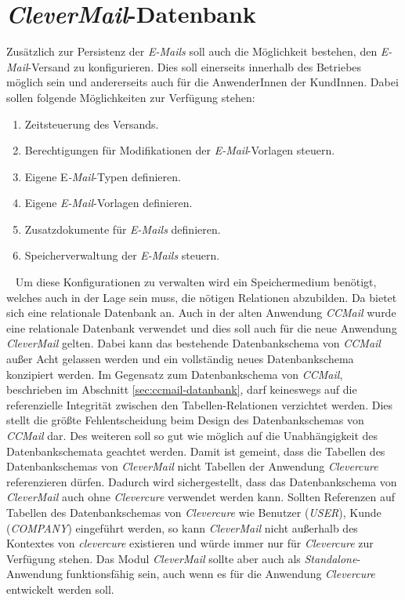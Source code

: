 \section{\emph{CleverMail}-Datenbank}
Zusätzlich zur Persistenz der \emph{E-Mails} soll auch die Möglichkeit bestehen, den \emph{E-Mail}-Versand zu konfigurieren. Dies soll einerseits innerhalb des Betriebes möglich sein und andererseits auch für die AnwenderInnen der KundInnen. Dabei sollen folgende Möglichkeiten zur Verfügung stehen:
\begin{enumerate}
	\item Zeitsteuerung des Versands.
	\item Berechtigungen für Modifikationen der \emph{E-Mail}-Vorlagen steuern.
	\item Eigene E\emph{-Mail}-Typen definieren.
	\item Eigene \emph{E-Mail}-Vorlagen definieren.
	\item Zusatzdokumente für \emph{E-Mails} definieren. 
	\item Speicherverwaltung der \emph{E-Mails} steuern.
\end{enumerate}
\ \newline
Um diese Konfigurationen zu verwalten wird ein Speichermedium benötigt, welches auch in der Lage sein muss, die nötigen Relationen abzubilden. Da bietet sich eine relationale Datenbank an. Auch in der alten Anwendung \emph{CCMail} wurde eine relationale Datenbank verwendet und dies soll auch für die neue Anwendung \emph{CleverMail} gelten. Dabei kann das bestehende Datenbankschema von \emph{CCMail} außer Acht gelassen werden und ein vollständig neues Datenbankschema konzipiert werden. 
\newline
\newline
Im Gegensatz zum Datenbankschema von \emph{CCMail}, beschrieben im Abschnitt \ref{sec:ccmail-datanbank}, darf keineswegs auf die referenzielle Integrität zwischen den Tabellen-Relationen verzichtet werden. Dies stellt die größte Fehlentscheidung beim Design des Datenbankschemas von \emph{CCMail} dar. Des weiteren soll so gut wie möglich auf die Unabhängigkeit des Datenbankschemata geachtet werden. Damit ist gemeint, dass die Tabellen des Datenbankschemas von \emph{CleverMail} nicht Tabellen der Anwendung \emph{Clevercure} referenzieren dürfen. Dadurch wird sichergestellt, dass das Datenbankschema von \emph{CleverMail} auch ohne \emph{Clevercure} verwendet werden kann. Sollten Referenzen auf Tabellen des Datenbankschemas von \emph{Clevercure} wie Benutzer (\emph{USER}), Kunde (\emph{COMPANY}) eingeführt werden, so kann \emph{CleverMail} nicht außerhalb des Kontextes von \emph{clevercure} existieren und würde immer nur für \emph{Clevercure} zur Verfügung stehen. Das Modul \emph{CleverMail} sollte aber auch als \emph{Standalone}-Anwendung funktionsfähig sein, auch wenn es für die Anwendung \emph{Clevercure} entwickelt werden soll. 
